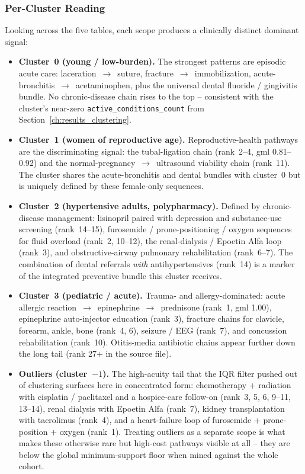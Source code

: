 \subsubsection*{Per-Cluster Reading}

Looking across the five tables, each scope produces a clinically distinct dominant signal:

\begin{itemize}
    \item \textbf{Cluster~0 (young / low-burden).} The strongest patterns are episodic acute care: laceration~$\to$~suture, fracture~$\to$~immobilization, acute-bronchitis~$\to$~acetaminophen, plus the universal dental fluoride / gingivitis bundle. No chronic-disease chain rises to the top -- consistent with the cluster's near-zero \texttt{active\_conditions\_count} from Section~\ref{ch:results_clustering}.
    \item \textbf{Cluster~1 (women of reproductive age).} Reproductive-health pathways are the discriminating signal: the tubal-ligation chain (rank~2--4, gml 0.81--0.92) and the normal-pregnancy~$\to$~ultrasound viability chain (rank~11). The cluster shares the acute-bronchitis and dental bundles with cluster~0 but is uniquely defined by these female-only sequences.
    \item \textbf{Cluster~2 (hypertensive adults, polypharmacy).} Defined by chronic-disease management: lisinopril paired with depression and substance-use screening (rank~14--15), furosemide / prone-positioning / oxygen sequences for fluid overload (rank~2, 10--12), the renal-dialysis / Epoetin Alfa loop (rank~3), and obstructive-airway pulmonary rehabilitation (rank~6--7). The combination of dental referrals \emph{with} antihypertensives (rank~14) is a marker of the integrated preventive bundle this cluster receives.
    \item \textbf{Cluster~3 (pediatric / acute).} Trauma- and allergy-dominated: acute allergic reaction~$\to$~epinephrine~$\to$~prednisone (rank~1, gml 1.00), epinephrine auto-injector education (rank~3), fracture chains for clavicle, forearm, ankle, bone (rank~4, 6), seizure / EEG (rank~7), and concussion rehabilitation (rank~10). Otitis-media antibiotic chains appear further down the long tail (rank 27+ in the source file).
    \item \textbf{Outliers (cluster~$-1$).} The high-acuity tail that the IQR filter pushed out of clustering surfaces here in concentrated form: chemotherapy + radiation with cisplatin / paclitaxel and a hospice-care follow-on (rank~3, 5, 6, 9--11, 13--14), renal dialysis with Epoetin Alfa (rank~7), kidney transplantation with tacrolimus (rank~4), and a heart-failure loop of furosemide + prone-position + oxygen (rank~1). Treating outliers as a separate scope is what makes these otherwise rare but high-cost pathways visible at all -- they are below the global minimum-support floor when mined against the whole cohort.
\end{itemize}

